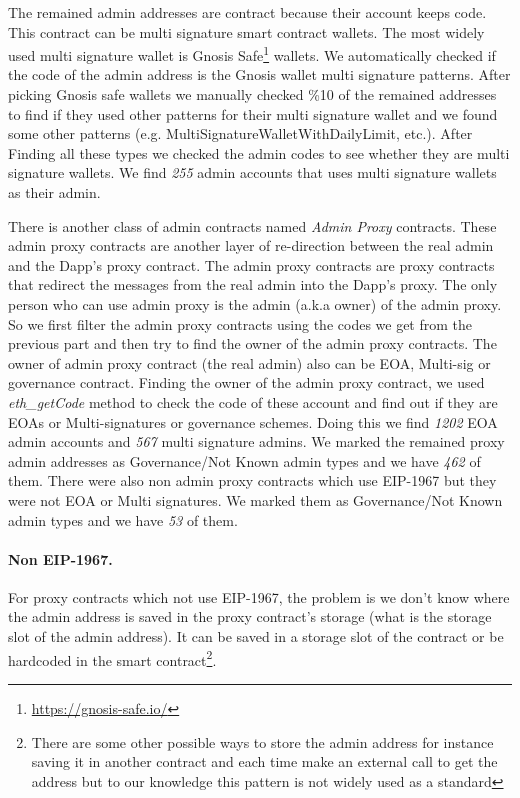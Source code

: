 The remained admin addresses are contract because their account keeps code. This contract can be multi signature smart contract wallets. The most widely used multi signature wallet is Gnosis Safe\footnote{\url{https://gnosis-safe.io/}} wallets. We automatically checked if the code of the admin address is the Gnosis wallet multi signature patterns. After picking Gnosis safe wallets we manually checked \%10 of the remained addresses to find if they used other patterns for their multi signature wallet and we found some other patterns (e.g. MultiSignatureWalletWithDailyLimit, etc.). After Finding all these types we checked the admin codes to see whether they are multi signature wallets. We find \textit{255} admin accounts that uses multi signature wallets as their admin.

There is another class of admin contracts named \textit{Admin Proxy} contracts. These admin proxy contracts are another layer of re-direction between the real admin and the Dapp's proxy contract. The admin proxy contracts are proxy contracts that redirect the messages from the real admin into the Dapp's proxy. The only person who can use admin proxy is the admin (a.k.a owner) of the admin proxy. So we first filter the admin proxy contracts using the codes we get from the previous part and then try to find the owner of the admin proxy contracts. The owner of admin proxy contract (the real admin) also can be EOA, Multi-sig or governance contract. Finding the owner of the admin proxy contract, we used \textit{eth\_getCode} method to check the code of these account and find out if they are EOAs or Multi-signatures or governance schemes. Doing this we find \textit{1202} EOA admin accounts and \textit{567} multi signature admins. We marked the remained proxy admin addresses as Governance/Not Known admin types and we have \textit{462} of them. There were also non admin proxy contracts which use EIP-1967 but they were not EOA or Multi signatures. We marked them as Governance/Not Known admin types and we have \textit{53} of them.


\paragraph{Non EIP-1967.}

For proxy contracts which not use EIP-1967, the problem is we don't know where the admin address is saved in the proxy contract's storage (what is the storage slot of the admin address). It can be saved in a storage slot of the contract or be hardcoded in the smart contract\footnote{There are some other possible ways to store the admin address for instance saving it in another contract and each time make an external call to get the address but to our knowledge this pattern is not widely used as a standard}. 

